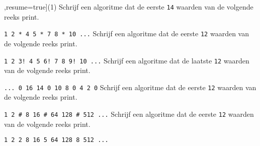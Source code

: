 \begin{exercise}
    \begin{longtasks}[counter-format=7.tsk[1],resume=true](1)
        \task
        Schrijf een algoritme dat de eerste \texttt{14} waarden van de volgende reeks print.

        \texttt{1 2 * 4 5 * 7 8 * 10 ...}
        \task
        Schrijf een algoritme dat de eerste \texttt{12} waarden van de volgende reeks print.

        \texttt{1 2 3! 4 5 6! 7 8 9! 10 ...}
        \task
        Schrijf een algoritme dat de laatste \texttt{12} waarden van de volgende reeks print.

        \texttt{... 0 16 14 0 10 8 0 4 2 0}
        \task
        Schrijf een algoritme dat de eerste \texttt{12} waarden van de volgende reeks print.

        \texttt{1 2 \# 8 16 \# 64 128 \# 512 ...}
        \task
        Schrijf een algoritme dat de eerste \texttt{12} waarden van de volgende reeks print.

        \texttt{1 2 2 8 16 5 64 128 8 512 ...}
    \end{longtasks}
\end{exercise}

